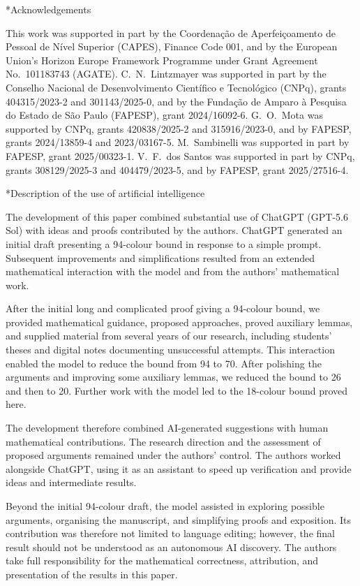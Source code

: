 \documentclass[12pt,reqno,a4paper]{amsart}
\makeatletter
\let\origsection=\section %
\def\section{\@ifstar{\origsection*}{\mysection}}
\def\mysection{\@startsection{section}{1}\z@{.7\linespacing\@plus\linespacing}{.5\linespacing}{\normalfont\scshape\centering\S}}
\makeatother
\begin{document}
\section*{Acknowledgements}

This work was supported in part by the Coordena\c{c}\~{a}o de
Aperfei\c{c}oamento de Pessoal de N{\'i}vel Superior (CAPES), Finance Code 001,
and by the European Union's Horizon Europe Framework Programme under Grant
Agreement No.~101183743 (AGATE).
C.~N.~Lintzmayer was supported in part by the Conselho Nacional de
Desenvolvimento Cient{\'i}fico e Tecnol{\'o}gico (CNPq), grants 404315/2023-2
and 301143/2025-0, and by the Funda\c{c}\~{a}o de Amparo à Pesquisa do Estado
de S\~{a}o Paulo (FAPESP), grant 2024/16092-6.
G.~O.~Mota was supported by CNPq, grants 420838/2025-2 and 315916/2023-0, and
by FAPESP, grants 2024/13859-4 and 2023/03167-5.
M.~Sambinelli was supported in part by FAPESP, grant 2025/00323-1.
V.~F.~dos Santos was supported in part by CNPq, grants 308129/2025-3 and
404479/2023-5, and by FAPESP, grant 2025/27516-4.

\section*{Description of the use of artificial intelligence}

The development of this paper combined substantial use of ChatGPT (GPT-5.6 Sol)
with ideas and proofs contributed by the authors.
ChatGPT generated an initial draft presenting a 94-colour bound in response to
a simple prompt.
Subsequent improvements and simplifications resulted from an extended
mathematical interaction with the model and from the authors' mathematical
work.

After the initial long and complicated proof giving a 94-colour bound, we
provided mathematical guidance, proposed approaches, proved auxiliary lemmas,
and supplied material from several years of our research, including students'
theses and digital notes documenting unsuccessful attempts.
This interaction enabled the model to reduce the bound from 94 to 70. 
After polishing the arguments and improving some auxiliary lemmas, we reduced
the bound to 26 and then to 20. 
Further work with the model led to the 18-colour bound proved here.

The development therefore combined AI-generated suggestions with human
mathematical contributions. 
The research direction and the assessment of proposed arguments remained under
the authors' control.
The authors worked alongside ChatGPT, using it as an assistant to speed up
verification and provide ideas and intermediate results.

Beyond the initial 94-colour draft, the model assisted in exploring possible
arguments, organising the manuscript, and simplifying proofs and exposition. 
Its contribution was therefore not limited to language editing; however, the
final result should not be understood as an autonomous AI discovery.
The authors take full responsibility for the mathematical correctness,
attribution, and presentation of the results in this paper.



\end{document}
